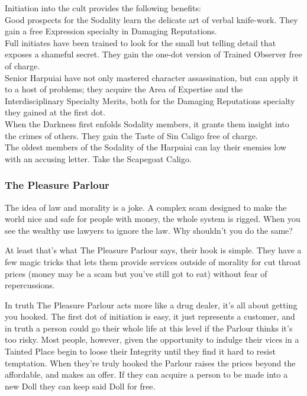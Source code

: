 Initiation into the cult provides the following benefits: \\

\noindent \textbullet Good prospects for the Sodality learn the delicate art of verbal knife-work. They gain a free Expression specialty in Damaging Reputations.\\
\noindent \textbullet\textbullet Full initiates have been trained to look for the small but telling detail that exposes a shameful secret. They gain the one-dot version of Trained Observer free of charge.\\
\noindent \textbullet\textbullet\textbullet Senior Harpuiai have not only mastered character assassination, but can apply it to a host of problems; they acquire the Area of Expertise and the Interdisciplinary Specialty Merits, both for the Damaging Reputations specialty they gained at the first dot.\\
\noindent \textbullet\textbullet\textbullet\textbullet When the Darkness first enfolds Sodality members, it grants them insight into the crimes of others. They gain the Taste of Sin Caligo free of charge.\\
\noindent \textbullet\textbullet\textbullet\textbullet\textbullet The oldest members of the Sodality of the Harpuiai can lay their enemies low with an accusing letter. Take the Scapegoat Caligo.


\subsubsection*{The Pleasure Parlour}

The idea of law and morality is a joke. A complex scam designed to make the world nice and safe for people with money, the whole system is rigged. When you see the wealthy use lawyers to ignore the law. Why shouldn't you do the same? 

At least that's what The Pleasure Parlour says, their hook is simple. They have a few magic tricks that lets them provide services outside of morality for cut throat prices (money may be a scam but you've still got to eat) without fear of repercussions. 

In truth The Pleasure Parlour acts more like a drug dealer, it's all about getting you hooked. The first dot of initiation is easy, it just represents a customer, and in truth a person could go their whole life at this level if the Parlour thinks it's too risky. Most people, however, given the opportunity to indulge their vices in a Tainted Place begin to loose their Integrity until they find it hard to resist temptation. When they're truly hooked the Parlour raises the prices beyond the affordable, and makes an offer. If they can acquire a person to be made into a new Doll they can keep said Doll for free. 

